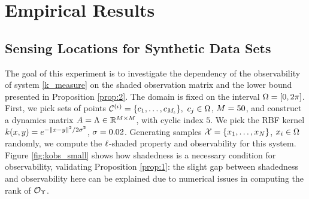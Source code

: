 \section{Empirical Results}


\subsection{Sensing Locations for Synthetic Data Sets}\label{sec:exp}
 The goal of this experiment is to investigate the dependency of the observability of system \eqref{k_measure} on the shaded observation matrix and the lower bound presented in Proposition \ref{prop:2}. The domain is fixed on the interval $\Omega = [0,2\pi]$. First, we pick sets of points $\mathcal{C}^{(\iota)} = \{c_1,\dots,c_{M_{\iota}}\}, \ c_{j}\in\Omega$, $M=50$, and construct a dynamics matrix $A = \Lambda \in {\mathbb{R}^{M\times M}}$, with cyclic index $5$.  We pick the RBF kernel $k(x,y) = e^{-\|x-y\|^2/2\sigma^2}$, $\sigma=0.02$. Generating samples $\mathcal{X}=\{x_1, \dots, x_{N}\}$, $x_{i}\in\Omega$ randomly, we compute the $\ell$-shaded property and observability for this system. Figure \ref{fig:kobs_small} shows how shadedness is a necessary condition for observability, validating Proposition \ref{prop:1}: the slight gap between shadedness and observability here can be explained due to numerical issues in computing the rank of $\mathcal{O}_{\Upsilon}$. 
 
